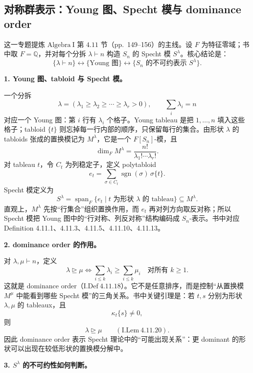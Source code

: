 \documentclass[a4paper]{ctexart}
\theoremstyle{definition}
\theoremstyle{analysis}
\theoremstyle{plain}
\begin{document}
\subsection{\texorpdfstring{对称群表示：Young 图、Specht 模与 dominance order}{对称群表示：Young 图、Specht 模与 dominance order}}\label{subsec:topic-symmetric-specht}

这一专题提炼 \(\mathrm{Algebra\ I}\) 第 \(4.11\) 节（pp.~149--156）的主线。设 \(F\) 为特征零域；书中取 \(F=\mathbb Q\)，并对每个分拆 \(\lambda\vdash n\) 构造 \(S_n\) 的 Specht 模 \(S^\lambda\)。核心结论是：
\[
  \{\lambda\vdash n\}
  \longleftrightarrow
  \{\text{Young 图}\}
  \longleftrightarrow
  \{\text{\(S_n\) 的不可约表示 }S^\lambda\}.
\]

\label{rem:young-specht-dominance}
\textbf{1. Young 图、tabloid 与 Specht 模。}

一个分拆
\[
  \lambda=(\lambda_1\geq \lambda_2\geq\cdots\geq \lambda_r>0),
  \qquad
  \sum_i\lambda_i=n
\]
对应一个 Young 图：第 \(i\) 行有 \(\lambda_i\) 个格子。Young tableau 是把 \(1,\dots,n\) 填入这些格子；tabloid \(\{t\}\) 则忘掉每一行内部的顺序，只保留每行的集合。由形状 \(\lambda\) 的 tabloids 张成的置换模记为 \(M^\lambda\)，它是一个 \(F[S_n]\)-模，且
\[
  \dim_F M^\lambda=\frac{n!}{\lambda_1!\cdots \lambda_r!}.
\]
对 tableau \(t\)，令 \(C_t\) 为列稳定子，定义 polytabloid
\[
  e_t=\sum_{\sigma\in C_t}\operatorname{sgn}(\sigma)\,\sigma\{t\}.
\]
Specht 模定义为
\[
  S^\lambda=\operatorname{span}_F\{e_t\mid t\text{ 为形状 }\lambda\text{ 的 tableau}\}
  \subseteq M^\lambda.
\]
直观上，\(M^\lambda\) 先按“行集合”组织置换作用，而 \(e_t\) 再对列方向取反对称；所以 Specht 模把 Young 图中的“行对称、列反对称”结构编码成 \(S_n\)-表示。书中对应 Definition 4.11.1、4.11.3、4.11.5、4.11.10、4.11.13。

\medskip
\textbf{2. dominance order 的作用。}

对 \(\lambda,\mu\vdash n\)，定义
\[
  \lambda\trianglerighteq\mu
  \iff
  \sum_{i\leq k}\lambda_i\geq \sum_{i\leq k}\mu_i
  \quad \text{对所有 }k\geq 1.
\]
这就是 dominance order（\(\mathrm{I.Def}\ 4.11.18\)）。它不是任意排序，而是控制“从置换模 \(M^\mu\) 中能看到哪些 Specht 模”的三角关系。书中关键引理是：若 \(t,s\) 分别为形状 \(\lambda,\mu\) 的 tableaux，且
\[
  \kappa_t\{s\}\neq 0,
\]
则
\[
  \lambda\trianglerighteq \mu
  \qquad
  (\mathrm{I.Lem}\ 4.11.20).
\]
因此 dominance order 表示 Specht 理论中的“可能出现关系”：更 dominant 的形状可以出现在较低形状的置换模分解中。

\label{rem:specht-irreducible-dimension}
\textbf{3. \(S^\lambda\) 的不可约性如何判断。}
\end{document}
